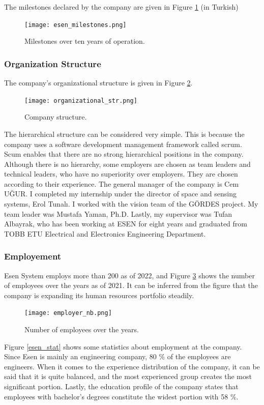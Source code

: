 \documentclass[letterpaper,12pt]{article}
\begin{document}
The milestones declared by the company are given in Figure \ref{esen_milstone} (in Turkish)

\begin{figure}[H]
    \centering
    \texttt{[image: esen\_milestones.png]}
    \caption{Milestones over ten years of operation.}
    \label{esen_milstone}
\end{figure} 
    
\subsubsection{Organization Structure}
The company's organizational structure is given in Figure \ref*{esen_str}.
\begin{figure}[H]
    \centering
    \texttt{[image: organizational\_str.png]}
    \caption{Company structure.}
    \label{esen_str}
\end{figure} 
The hierarchical structure can be considered very simple. This is because the company uses a software development management framework called scrum. Scum enables that there are no strong hierarchical positions in the company. Although there is no hierarchy, some employers are chosen as team leaders and technical leaders, who have no superiority over employers. They are chosen according to their experience. The general manager of the company is Cem UĞUR. I completed my internship under the director of space and sensing systems, Erol Tunalı. I worked with the vision team of the GÖRDES project. My team leader was Mustafa Yaman, Ph.D. Lastly, my supervisor was Tufan Albayrak, who has been working at ESEN for eight years and graduated from TOBB ETU Electrical and Electronics Engineering Department.

\subsubsection{Employement}
Esen System employs more than 200 as of 2022, and Figure \ref*{esen_nb} shows the number of employees over the years as of 2021. It can be inferred from the figure that the company is expanding its human resources portfolio steadily. 

\begin{figure}[H]
    \centering
    \texttt{[image: employer\_nb.png]}
    \caption{Number of employees over the years.}
    \label{esen_nb}
\end{figure} 

Figure \ref*{esen_stat} shows some statistics about employment at the company. Since Esen is mainly an engineering company, 80 \% of the employees are engineers. When it comes to the experience distribution of the company, it can be said that it is quite balanced, and the most experienced group creates the most significant portion. Lastly, the education profile of the company states that employees with bachelor's degrees constitute the widest portion with 58 \%.
\end{document}
